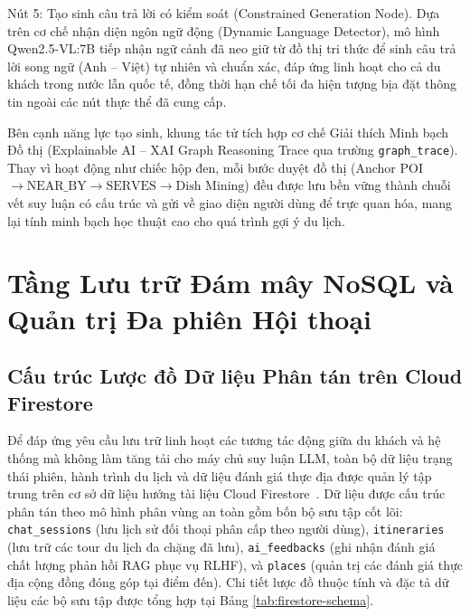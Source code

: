 Nút 5: Tạo sinh câu trả lời có kiểm soát (Constrained Generation Node). Dựa trên cơ chế nhận diện ngôn ngữ động (Dynamic Language Detector), mô hình Qwen2.5-VL:7B tiếp nhận ngữ cảnh đã neo giữ từ đồ thị tri thức để sinh câu trả lời song ngữ (Anh -- Việt) tự nhiên và chuẩn xác, đáp ứng linh hoạt cho cả du khách trong nước lẫn quốc tế, đồng thời hạn chế tối đa hiện tượng bịa đặt thông tin ngoài các nút thực thể đã cung cấp.

Bên cạnh năng lực tạo sinh, khung tác tử tích hợp cơ chế Giải thích Minh bạch Đồ thị (Explainable AI -- XAI Graph Reasoning Trace qua trường \texttt{graph\_trace}). Thay vì hoạt động như chiếc hộp đen, mỗi bước duyệt đồ thị (Anchor POI $\to \text{NEAR\_BY} \to \text{SERVES} \to \text{Dish Mining}$) đều được lưu bền vững thành chuỗi vết suy luận có cấu trúc và gửi về giao diện người dùng để trực quan hóa, mang lại tính minh bạch học thuật cao cho quá trình gợi ý du lịch.

\section{Tầng Lưu trữ Đám mây NoSQL và Quản trị Đa phiên Hội thoại}
\label{sec:ch1-cloud-storage}

\subsection{Cấu trúc Lược đồ Dữ liệu Phân tán trên Cloud Firestore}
\label{subsec:ch1-firestore-schema}

Để đáp ứng yêu cầu lưu trữ linh hoạt các tương tác động giữa du khách và hệ thống mà không làm tăng tải cho máy chủ suy luận LLM, toàn bộ dữ liệu trạng thái phiên, hành trình du lịch và dữ liệu đánh giá thực địa được quản lý tập trung trên cơ sở dữ liệu hướng tài liệu Cloud Firestore~\cite{davoudian2018nosql, google2024firestore}. Dữ liệu được cấu trúc phân tán theo mô hình phân vùng an toàn gồm bốn bộ sưu tập cốt lõi: \texttt{chat\_sessions} (lưu lịch sử đối thoại phân cấp theo người dùng), \texttt{itineraries} (lưu trữ các tour du lịch đa chặng đã lưu), \texttt{ai\_feedbacks} (ghi nhận đánh giá chất lượng phản hồi RAG phục vụ RLHF), và \texttt{places} (quản trị các đánh giá thực địa cộng đồng đóng góp tại điểm đến). Chi tiết lược đồ thuộc tính và đặc tả dữ liệu các bộ sưu tập được tổng hợp tại Bảng \ref{tab:firestore-schema}.


